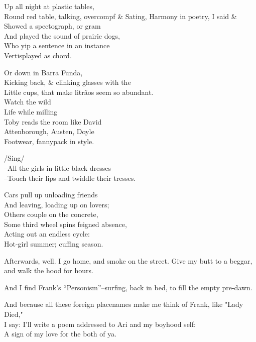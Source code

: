 Up all night at plastic tables, \\
Round red table, talking, overcompf \&
Sating, Harmony in poetry, I said \& \\
Showed a spectograph, or gram \\
And played the sound of prairie dogs, \\
Who yip a sentence in an instance \\
Vertisplayed as chord.

Or down in Barra Funda, \\
Kicking back, \& clinking glasses with the \\
Little cups, that make litrãos seem so abundant. \\
Watch the wild \\
Life while milling \\
Toby reads the room like David  \\
Attenborough, Austen, Doyle \\
Footwear, fannypack in style. 

/Sing/ \\
--All the girls in little black dresses \\
--Touch their lips and twiddle their tresses. 

Cars pull up unloading friends \\
And leaving, loading up on lovers; \\
Others couple on the concrete, \\
Some third wheel spins feigned absence, \\
Acting out an endless cycle: \\
Hot-girl summer; cuffing season.

Afterwards, well. I go home, and smoke on the street. Give my butt to a beggar, and walk the hood for hours.

And I find Frank's ``Personism''--surfing, back in bed, to fill the empty pre-dawn.

And because all these foreign placenames make me think of Frank, like "Lady Died," \\
I say: I'll write a poem addressed to Ari and my boyhood self: \\
A sign of my love for the both of ya. 